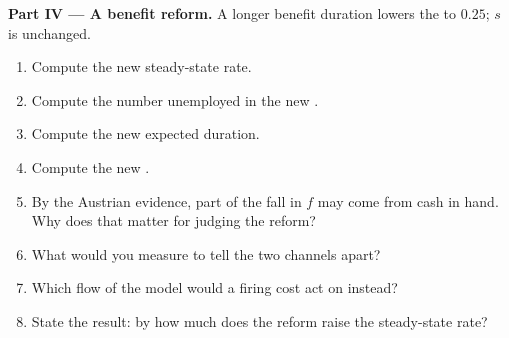 \begin{problem}
\medskip\noindent\textbf{Part IV --- A benefit reform.} A longer benefit duration
lowers the  to $0.25$; $s$ is unchanged.
\begin{enumerate}[resume]
  \item Compute the new steady-state rate.
  \item Compute the number unemployed in the new .
  \item Compute the new expected duration.
  \item Compute the new .
  \item By the Austrian evidence, part of the fall in $f$ may come from cash in hand. Why does that matter for judging the reform?
  \item What would you measure to tell the two channels apart?
  \item Which flow of the model would a firing cost act on instead?
  \item State the result: by how much does the reform raise the steady-state rate?
\end{enumerate}
\end{problem}
